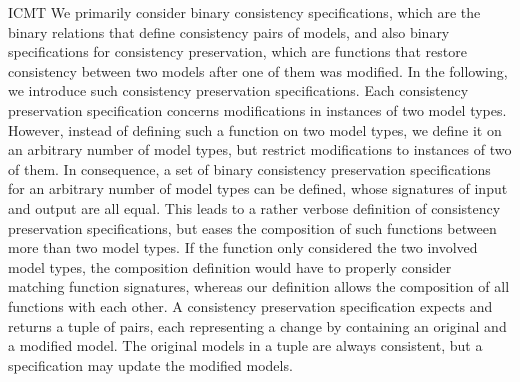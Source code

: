 \begin{copiedFrom}{ICMT}
We primarily consider binary consistency specifications, which are the binary relations that define consistency pairs of models, %
and also binary specifications for consistency preservation, which are functions that restore consistency between two models after one of them was modified. 
In the following, we introduce such consistency preservation specifications.
Each consistency preservation specification concerns modifications in instances of two model types.
However, instead of defining such a function on two model types, we define it on an arbitrary number of model types, but restrict modifications to instances of two of them.
In consequence, a set of binary consistency preservation specifications for an arbitrary number of model types can be defined, whose signatures of input and output are all equal.
This leads to a rather verbose definition of consistency preservation specifications, but eases the composition of such functions between more than two model types.
If the function only considered the two involved model types, the composition definition would have to properly consider matching function signatures, whereas our definition allows the composition of all functions with each other.
A consistency preservation specification expects and returns a tuple of pairs, each representing a change by containing an original and a modified model.
The original models in a tuple are always consistent, but a specification may update the modified models. %


\end{copiedFrom}
